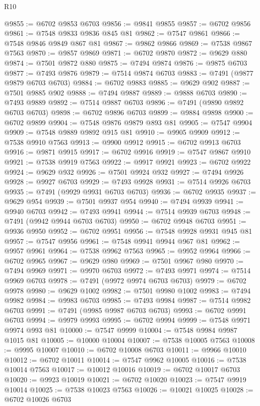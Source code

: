 \begin{lexlean}{R10}
\begin{coremodule}
@9855 := @6702 @9853 @6703
@9856 := @9841 @9855
@9857 := @6702 @9856
@9861 := @7548 @9833 @9836 @845 @81
@9862 := @7547 @9861
@9866 := @7548 @9846 @9849 @867 @81
@9867 := @9862 @9866
@9869 := @7538 @9867 @7563
@9870 := @9857 @9869
@9871 := @6702 @9870
@9872 := @9629 @880
@9874 := @7501 @9872 @880
@9875 := @7494 @9874
@9876 := @9875 @6703
@9877 := @7493 @9876
@9879 := @7514 @9874 @6703
@9883 := @7491 (@9877 @9879 @6703 @6703)
@9884 := @6702 @9883
@9885 := @9629 @902
@9887 := @7501 @9885 @902
@9888 := @7494 @9887
@9889 := @9888 @6703
@9890 := @7493 @9889
@9892 := @7514 @9887 @6703
@9896 := @7491 (@9890 @9892 @6703 @6703)
@9898 := @6702 @9896 @6703
@9899 := @9884 @9898
@9900 := @6702 @9899
@9904 := @7548 @9876 @9879 @893 @81
@9905 := @7547 @9904
@9909 := @7548 @9889 @9892 @915 @81
@9910 := @9905 @9909
@9912 := @7538 @9910 @7563
@9913 := @9900 @9912
@9915 := @6702 @9913 @6703
@9916 := @9871 @9915
@9917 := @6702 @9916
@9919 := @7547 @9867 @9910
@9921 := @7538 @9919 @7563
@9922 := @9917 @9921
@9923 := @6702 @9922
@9924 := @9629 @932
@9926 := @7501 @9924 @932
@9927 := @7494 @9926
@9928 := @9927 @6703
@9929 := @7493 @9928
@9931 := @7514 @9926 @6703
@9935 := @7491 (@9929 @9931 @6703 @6703)
@9936 := @6702 @9935
@9937 := @9629 @954
@9939 := @7501 @9937 @954
@9940 := @7494 @9939
@9941 := @9940 @6703
@9942 := @7493 @9941
@9944 := @7514 @9939 @6703
@9948 := @7491 (@9942 @9944 @6703 @6703)
@9950 := @6702 @9948 @6703
@9951 := @9936 @9950
@9952 := @6702 @9951
@9956 := @7548 @9928 @9931 @945 @81
@9957 := @7547 @9956
@9961 := @7548 @9941 @9944 @967 @81
@9962 := @9957 @9961
@9964 := @7538 @9962 @7563
@9965 := @9952 @9964
@9966 := @6702 @9965
@9967 := @9629 @980
@9969 := @7501 @9967 @980
@9970 := @7494 @9969
@9971 := @9970 @6703
@9972 := @7493 @9971
@9974 := @7514 @9969 @6703
@9978 := @7491 (@9972 @9974 @6703 @6703)
@9979 := @6702 @9978
@9980 := @9629 @1002
@9982 := @7501 @9980 @1002
@9983 := @7494 @9982
@9984 := @9983 @6703
@9985 := @7493 @9984
@9987 := @7514 @9982 @6703
@9991 := @7491 (@9985 @9987 @6703 @6703)
@9993 := @6702 @9991 @6703
@9994 := @9979 @9993
@9995 := @6702 @9994
@9999 := @7548 @9971 @9974 @993 @81
@10000 := @7547 @9999
@10004 := @7548 @9984 @9987 @1015 @81
@10005 := @10000 @10004
@10007 := @7538 @10005 @7563
@10008 := @9995 @10007
@10010 := @6702 @10008 @6703
@10011 := @9966 @10010
@10012 := @6702 @10011
@10014 := @7547 @9962 @10005
@10016 := @7538 @10014 @7563
@10017 := @10012 @10016
@10019 := @6702 @10017 @6703
@10020 := @9923 @10019
@10021 := @6702 @10020
@10023 := @7547 @9919 @10014
@10025 := @7538 @10023 @7563
@10026 := @10021 @10025
@10028 := @6702 @10026 @6703

\end{coremodule}
\end{lexlean}
